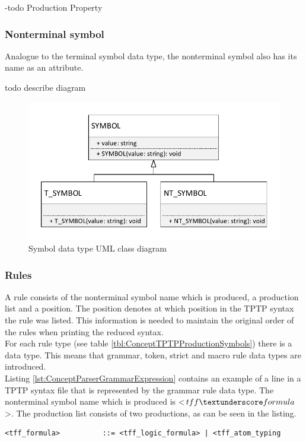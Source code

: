 -todo Production Property

\subsubsection{Nonterminal symbol}
Analogue to the terminal symbol data type, the nonterminal symbol also has its name as an attribute.

todo describe diagram
\begin{figure}[H]
\centering
\includegraphics[width=.8\textwidth]{images/Concept_uml_data_types_symbols.pdf}
\caption{Symbol data type UML class diagram}
\label{fig:ConceptSymbolsClassDiagram}
\end{figure}

\subsubsection{Rules}
A rule consists of the nonterminal symbol name which is produced, a production list and a position.
The position denotes at which position in the \ac{TPTP} syntax the rule was listed.
This information is needed to maintain the original order of the rules when printing the reduced syntax.\\
For each rule type (see table \ref{tbl:ConceptTPTPProductionSymbols}) there is a data type.
This means that grammar, token, strict and macro rule data types are introduced.\\
Listing \ref{lst:ConceptParserGrammarExpression} contains an example of a line in a \ac{TPTP} syntax file that is represented by the grammar rule data type.
The nonterminal symbol name which is produced is <$tff \textunderscore formula$>.  The production list consists of two productions, as can be seen in the listing.
\begin{lstlisting}[basicstyle=\scriptsize	,caption= Grammar expression,label= lst:ConceptParserGrammarExpression]
<tff_formula>          ::= <tff_logic_formula> | <tff_atom_typing
\end{lstlisting}


